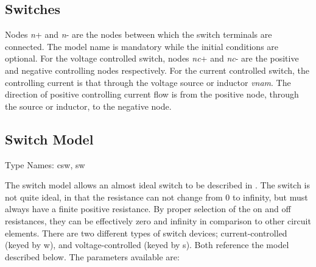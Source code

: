 \subsection{Switches}



Nodes {\it n\/}{\vt +} and {\it n\/}{\vt -} are the nodes between
which the switch terminals are connected.  The {\vt model} name is
mandatory while the initial conditions are optional.  For the voltage
controlled switch, nodes {\it nc\/}{\vt +} and {\it nc\/}{\vt -} are
the positive and negative controlling nodes respectively.  For the
current controlled switch, the controlling current is that through the
voltage source or inductor {\it vnam}.  The direction of positive
controlling current flow is from the positive node, through the source
or inductor, to the negative node.

\subsection{Switch Model}
\label{swmodel}


{\cb Type Names:} {\vt csw}, {\vt sw}

The switch model allows an almost ideal switch to be described in
{\WRspice}.  The switch is not quite ideal, in that the resistance can
not change from 0 to infinity, but must always have a finite positive
resistance.  By proper selection of the on and off resistances, they
can be effectively zero and infinity in comparison to other circuit
elements.  There are two different types of switch devices;
current-controlled (keyed by {\vt w}), and voltage-controlled (keyed
by {\vt s}).  Both reference the model described below.  The
parameters available are:

